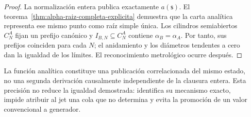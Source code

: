 \begin{proof}
La normalización entera publica exactamente \(a(\mathsf s)\). El
teorema~\ref{thm:alpha-raiz-completa-explicita} demuestra que la carta
analítica representa ese mismo punto como raíz simple única. Los
cilindros semiabiertos \(C_N^A\) fijan un prefijo canónico y
\(I_{B,N}\subseteq C_N^A\) contiene \(\alpha_B=\alpha_A\). Por tanto, sus
prefijos coinciden para cada \(N\); el anidamiento y los diámetros tendentes a
cero dan la igualdad de los límites. El reconocimiento
metrológico ocurre después.
\end{proof}

La función analítica constituye una publicación correlacionada del mismo
estado, no una segunda derivación causalmente independiente de la clausura
entera. Esta precisión no reduce la igualdad demostrada: identifica su
mecanismo exacto, impide atribuir al jet una cola que no determina y evita la
promoción de un valor convencional a generador.

